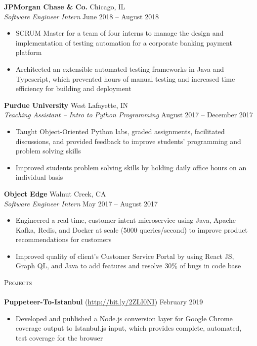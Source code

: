 \documentclass[letterpaper, 10pt]{article}
\newcommand{\lineunder} {
    \vspace*{-8pt} \\
    \hspace*{-18pt} \hrulefill \\
}
\newcommand{\header} [1] {
    {
        \hspace*{-18pt}\vspace*{6pt}
        {\large\textsc{#1}}
    }
    \vspace*{-6pt} \lineunder
}
\begin{document}
\textbf{JPMorgan Chase \& Co.} \hfill Chicago, IL\\
\textit{Software Engineer Intern} \hfill June 2018 -- August 2018\\
\vspace{-1mm}
\begin{itemize} \itemsep 1pt
    \item SCRUM Master for a team of four interns to manage the design and implementation of testing automation for a corporate banking payment platform
    \item Architected an extensible automated testing frameworks in Java and Typescript, which prevented hours of manual testing and increased time efficiency for building and deployment
\end{itemize}

\textbf{Purdue University} \hfill West Lafayette, IN\\
\textit{Teaching Assistant -- Intro to Python Programming} \hfill August 2017 -- December 2017\\
\vspace{-1mm}
\begin{itemize} \itemsep 1pt
    \item Taught Object-Oriented Python labs, graded assignments, facilitated discussions, and provided feedback to improve students’ programming and problem solving skills
    \item Improved students problem solving skills by holding daily office hours on an individual basis
\end{itemize}

\textbf{Object Edge} \hfill Walnut Creek, CA\\
\textit{Software Engineer Intern} \hfill May 2017 -- August 2017\\
\vspace{-1mm}
\begin{itemize} \itemsep 1pt
    \item Engineered a real-time, customer intent microservice using Java, Apache Kafka, Redis, and Docker at scale (5000 queries/second) to improve product recommendations for customers
    \item Improved quality of client’s Customer Service Portal by using React JS, Graph QL, and Java to add features and resolve 30\% of bugs in code base
\end{itemize}

\header{Projects}
{\textbf{Puppeteer-To-Istanbul}} (\href{http://bit.ly/2ZLI0NI}{http://bit.ly/2ZLI0NI}) \hfill February 2019\\
\vspace{-1mm}
\begin{itemize} \itemsep 1pt
    \item Developed and published a Node.js conversion layer for Google Chrome coverage output to Istanbul.js input, which provides complete, automated, test coverage for the browser
\end{itemize}
\vspace*{2mm}
\end{document}

